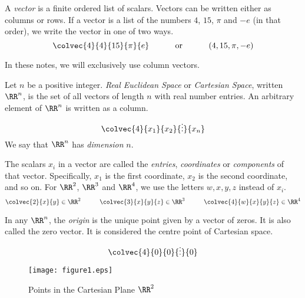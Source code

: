 \documentclass[fleqn]{report}
\begin{document}
\begin{defn}
A \emph{vector} is a finite ordered list of scalars. Vectors
can be written either as columns or rows. 
If a vector is a list of the numbers $4$, $15$, $\pi$ and $-e$ (in that
order), we write the vector in one of two ways.
\begin{displaymath}
\colvec{4}{4}{15}{\pi}{e} \hspace{1cm} \text{ or }
\hspace{1cm} (4, 15, \pi, -e)
\end{displaymath}
\end{defn}

In these notes, we will exclusively use column vectors.

\begin{defn}
Let $n$ be a positive integer. \emph{Real Euclidean Space} or
\emph{Cartesian Space}, written $\RR^n$, is the set of all
vectors of length $n$ with real number entries. An arbitrary
element of $\RR^n$ is written as a column. 
\begin{displaymath}
\colvec{4}{x_1}{x_2}{\vdots}{x_n}
\end{displaymath}
We say that $\RR^n$ has \emph{dimension} $n$. 
\end{defn}

\begin{defn}
The scalars $x_i$ in a vector are
called the \emph{entries}, \emph{coordinates} or \emph{components} of that
vector. Specifically, $x_1$ is the first coordinate, $x_2$ is
the second coordinate, and so on. 
For $\RR^2$, $\RR^3$ and $\RR^4$, we use the letters $w,x,y,z$
instead of $x_i$.
\begin{displaymath}
\colvec{2}{x}{y} \in \RR^2 \hspace{1cm}
\colvec{3}{x}{y}{z} \in \RR^3 \hspace{1cm}
\colvec{4}{w}{x}{y}{z} \in \RR^4
\end{displaymath}
\end{defn}

\begin{defn}
In any $\RR^n$, the \emph{origin} is the unique point given by a
vector of zeros. It is also called the zero vector. It is
considered the centre point of Cartesian space.
\begin{displaymath}
\colvec{4}{0}{0}{\vdots}{0}
\end{displaymath}
\end{defn}

\begin{figure}[t]
\centering
\texttt{[image: figure1.eps]}
\caption{Points in the Cartesian Plane $\RR^2$}
\label{points-in-the-cartesian-plane}
\end{figure}
\end{document}
